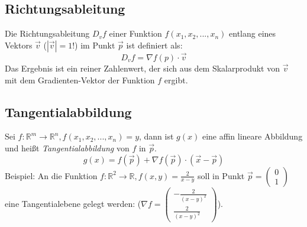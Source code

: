 \subsection{Richtungsableitung} %
\label{sub:richtungsableitung}

Die Richtungsableitung $D_vf$ einer Funktion $f(x_1,x_2,...,x_n)$ entlang 
eines Vektors $\overrightarrow{v}$ ($|\overrightarrow{v}| = 1$!) 
im Punkt $\overrightarrow{p}$ ist definiert als:
\begin{equation}
	D_vf = \nabla f(p) \cdot \overrightarrow{v}
\end{equation}
Das Ergebnis ist ein reiner Zahlenwert, der sich aus dem Skalarprodukt von $\overrightarrow{v}$ mit dem Gradienten-Vektor
der Funktion $f$ ergibt.

\subsection{Tangentialabbildung} %
\label{sub:tangentialabbildung}
Sei $f : \mathbb{R}^m \rightarrow \mathbb{R}^n, f(x_1,x_2,...,x_n) = y$, dann ist $g(x)$ eine affin lineare Abbildung und heißt
\emph{Tangentialabbildung} von $f$ in $\overrightarrow{p}$.
\begin{equation}
	g(x) = f(\overrightarrow{p}) + \nabla f(\overrightarrow{p})\cdot(\overrightarrow{x}-\overrightarrow{p})
\end{equation}
Beispiel: An die Funktion $f : \mathbb{R}^2 \rightarrow \mathbb{R}, f(x,y) = \frac{2}{x-y}$ soll in Punkt $\overrightarrow{p} = 
\left(\begin{array}{c}0\\1\end{array}\right)$ eine Tangentialebene gelegt werden:
($\nabla f = \left(\begin{array}{c}-\frac{2}{(x-y)^2}\\\frac{2}{(x-y)^2}\end{array}\right)$). 
